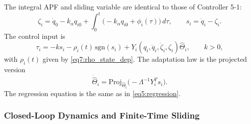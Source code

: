 The integral APF and sliding variable are identical to those of Controller 5-1:
\begin{equation}\label{eq7:zeta}
	\zeta_i = \dot{q}_0 - k_\alpha q_{i0}
	+ \int_0^t \bigl(-k_\alpha q_{i0} + \phi_i(\tau)\bigr)\,d\tau,\qquad
	s_i = \dot{q}_i - \zeta_i.
\end{equation}
The control input is
\begin{equation}\label{eq7:control_input}
	\tau_i = -k s_i - \rho_i(t)\,\mathrm{sgn}(s_i)
	+ Y_i(q_i,\dot{q}_i,\dot{\zeta}_i,\zeta_i) \hat{\Theta}_i,\qquad k>0,
\end{equation}
with $\rho_i(t)$ given by \eqref{eq7:rho_state_dep}.  The adaptation law is the projected version
\begin{equation}\label{eq7:adaptation}
	\dot{\hat{\Theta}}_i = \mathrm{Proj}_{\hat{\Theta}_i}\bigl(-\Lambda^{-1}Y_i^T s_i\bigr).
\end{equation}
The regression equation is the same as in \eqref{eq5:regression}.

\subsubsection{Closed-Loop Dynamics and Finite-Time Sliding}


